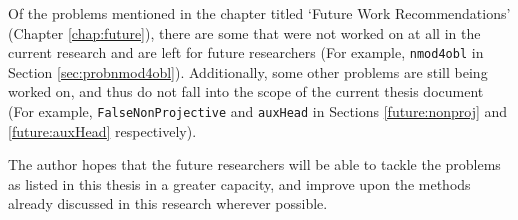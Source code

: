 Of the problems mentioned in the chapter titled `Future Work Recommendations' (Chapter \ref{chap:future}), there are some that were not worked on at all in the current research and are left for future researchers (For example, \texttt{nmod4obl} in Section  \ref{sec:probnmod4obl}). Additionally, some other problems are still being worked on, and thus do not fall into the scope of the current thesis document (For example, \texttt{FalseNonProjective} and \texttt{auxHead} in Sections \ref{future:nonproj} and \ref{future:auxHead} respectively).

The author hopes that the future researchers will be able to tackle the problems as listed in this thesis in a greater capacity, and improve upon the methods already discussed in this research wherever possible.